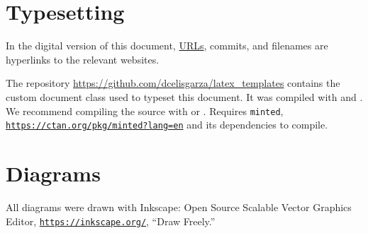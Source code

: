 \section{Typesetting}
\label{s:typeset}

In the digital version of this document, \href{https://www.youtube.com/watch?v=eh7lp9umG2I}{URLs}, commits, and filenames are hyperlinks to the relevant websites.

The repository \href{https://github.com/dcelisgarza/latex_templates}{https://github.com/dcelisgarza/latex\_templates} contains the custom document class used to typeset this document. It was compiled with  and . We recommend compiling the source with  or . Requires \texttt{minted}, \href{https://ctan.org/pkg/minted?lang=en}{\texttt{https://ctan.org/pkg/minted?lang=en}} and its dependencies to compile.
\section{Diagrams}
\label{s:diag}

All diagrams were drawn with Inkscape: Open Source Scalable Vector Graphics Editor, \href{https://inkscape.org/}{\texttt{https://inkscape.org/}}, ``Draw Freely.''
\savearabiccounter
